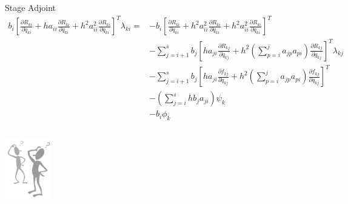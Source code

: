 \documentclass{beamer}
\newcommand{\pd}[2]{\frac{\partial #1}{\partial #2}}
\begin{document}
\begin{frame}[allowframebreaks]
  \scriptsize{
    \begin{block}{Stage Adjoint}
      \begin{equation}\nonumber
        \begin{split}
          b_i \left[ \pd{R_{ki}}{\ddot{q}_{ki}} + ha_{ii} \pd{R_{ki}}{\dot{q}_{ki}} + h^2 a_{ii}^2 \pd{R_{ki}}{{q}_{ki}} \right]^T \lambda_{ki} = & - b_i \left[ \pd{R_{ki}}{\ddot{q}_{ki}} + h^2a_{ii}^2 \pd{R_{ki}}{\dot{q}_{ki}} + h^2a_{ii}^2 \pd{R_{ki}}{{q}_{ki}} \right]^T \\
          & - \sum_{j=i+1}^s b_j \left[ ha_{ji} \pd{R_{kj}}{\dot{q}_{kj}} 
            + h^2 (\sum_{p=i}^j a_{jp}a_{pi}) 
            \pd{R_{kj}}{{q}_{kj}} \right]^T \lambda_{kj} \\
          & -  \sum_{j=i+1}^s b_j \left[ ha_{ji} \pd{f_{kj}}{\dot{q}_{kj}} 
            + h^2 (\sum_{p=i}^j a_{jp}a_{pi}) 
            \pd{f_{kj}}{{q}_{kj}} \right]^T  \\
          & -   (\sum_{j=i}^s h b_j a_{ji}) \psi_{k}  \\
          &  - b_i \phi_{k} 
        \end{split}
      \end{equation}
    \end{block}
  }
\end{frame}

\begin{frame}
  \begin{columns}
    \column{6cm}
    \begin{block}{}
      \centerline{ 
        \includegraphics[width=0.5\textwidth]{Question.png} 
      }
    \end{block}
  \end{columns}
\end{frame}
\end{document}
